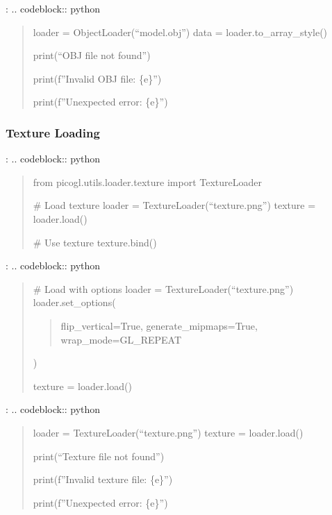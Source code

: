 \documentclass[a4paper,10pt,english,openany,oneside]{sphinxmanual}
\begin{document}
\sphinxAtStartPar
{}:
.. code\sphinxhyphen{}block:: python
\begin{quote}
\begin{description}
\sphinxAtStartPar
loader = ObjectLoader(“model.obj”)
data = loader.to\_array\_style()

\sphinxAtStartPar
print(“OBJ file not found”)

\sphinxAtStartPar
print(f”Invalid OBJ file: \{e\}”)

\sphinxAtStartPar
print(f”Unexpected error: \{e\}”)

\end{description}
\end{quote}


\subsubsection{Texture Loading}
\label{\detokenize{api/utils:texture-loading}}
\sphinxAtStartPar
{}:
.. code\sphinxhyphen{}block:: python
\begin{quote}

\sphinxAtStartPar
from picogl.utils.loader.texture import TextureLoader

\sphinxAtStartPar
\# Load texture
loader = TextureLoader(“texture.png”)
texture = loader.load()

\sphinxAtStartPar
\# Use texture
texture.bind()
\end{quote}

\sphinxAtStartPar
{}:
.. code\sphinxhyphen{}block:: python
\begin{quote}

\sphinxAtStartPar
\# Load with options
loader = TextureLoader(“texture.png”)
loader.set\_options(
\begin{quote}

\sphinxAtStartPar
flip\_vertical=True,
generate\_mipmaps=True,
wrap\_mode=GL\_REPEAT
\end{quote}

\sphinxAtStartPar
)

\sphinxAtStartPar
texture = loader.load()
\end{quote}

\sphinxAtStartPar
{}:
.. code\sphinxhyphen{}block:: python
\begin{quote}
\begin{description}
\sphinxAtStartPar
loader = TextureLoader(“texture.png”)
texture = loader.load()

\sphinxAtStartPar
print(“Texture file not found”)

\sphinxAtStartPar
print(f”Invalid texture file: \{e\}”)

\sphinxAtStartPar
print(f”Unexpected error: \{e\}”)

\end{description}
\end{quote}
\end{document}
